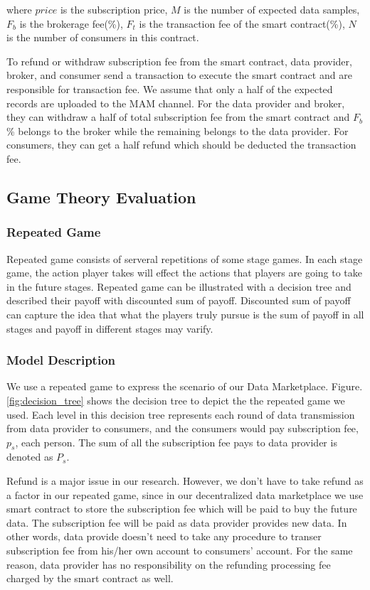 \documentclass[journal,10pt,a4paper]{IEEEtran}
\begin{document}
where $price$  is the subscription price, $M$ is the number of expected data samples, $F_{b}$ is the brokerage fee(\%), $F_{t}$ is the transaction fee of the smart contract(\%), $N$ is the number of consumers in this contract.

To refund or withdraw subscription fee from the smart contract, data provider, broker, and consumer send a transaction to execute the smart contract and are responsible for transaction fee. We assume that only a half of the expected records are uploaded to the MAM channel. For the data provider and broker, they can withdraw a half of total subscription fee from the smart contract and $F_{b}$ \% belongs to the broker while the remaining belongs to the data provider. For consumers, they can get a half refund which should be deducted the transaction fee.

\subsection{Game Theory Evaluation}
\subsubsection{Repeated Game}
Repeated game consists of serveral repetitions of some stage games. In each stage game, the action player takes will effect the actions that players are going to take in the future stages. Repeated game can be illustrated with a decision tree and described their payoff with discounted sum of payoff. Discounted sum of payoff can capture the idea that what the players truly pursue is the sum of payoff in all stages and payoff in different stages may varify.

\subsubsection{Model Description}
We use a repeated game to express the scenario of our Data Marketplace. Figure.\ref{fig:decision_tree} shows the decision tree to depict the the repeated game we used. Each level in this decision tree represents each round of data transmission from data provider to consumers, and the consumers would pay subscription fee, $p_s$, each person. The sum of all the subscription fee pays to data provider is denoted as $P_s$.

Refund is a major issue in our research. However, we don't have to take refund as a factor in our repeated game, since in our decentralized data marketplace we use smart contract to store the subscription fee which will be paid to buy the future data. The subscription fee will be paid as data provider provides new data. In other words, data provide doesn't need to take any procedure to transer subscription fee from his/her own account to consumers' account. For the same reason, data provider has no responsibility on the refunding processing fee charged by the smart contract as well.
\end{document}
